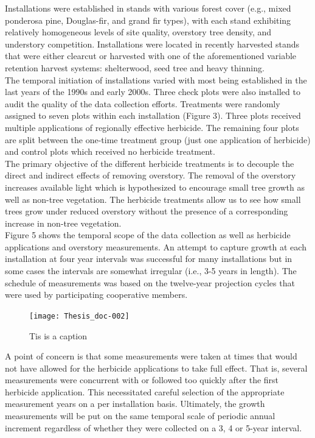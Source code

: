 \documentclass[10pt, letterpaper, fleqn]{article}
\begin{document}
Installations were established in stands with various forest cover (e.g., mixed ponderosa pine, Douglas-fir, and grand fir types), with each stand exhibiting relatively homogeneous levels of site quality, overstory tree density, and understory competition.  Installations were located in recently harvested stands that were either clearcut or harvested with one of the aforementioned variable retention harvest systems: shelterwood, seed tree and heavy thinning. \\[2pt]

The temporal initiation of installations varied with most being established in the last years of the 1990s and early 2000s.  Three check plots were also installed to audit the quality of the data collection efforts. Treatments were randomly assigned to seven plots within each installation (Figure 3).  Three plots received multiple applications of regionally effective herbicide.  The remaining four plots are split between the one-time treatment group (just one application of herbicide) and control plots which received no herbicide treatment.\\[2pt]

The primary objective of the different herbicide treatments is to decouple the direct and indirect effects of removing overstory. The removal of the overstory increases available light which is hypothesized to encourage small tree growth as well as non-tree vegetation.  The herbicide treatments allow us to see how small trees grow under reduced overstory without the presence of a corresponding increase in non-tree vegetation.\\[2pt]

Figure 5 shows the temporal scope of the data collection as well as herbicide applications and overstory measurements. An attempt to capture growth at each installation at four year intervals was successful for many installations but in some cases the intervals are somewhat irregular (i.e., 3-5 years in length). The schedule of measurements was based on the twelve-year projection cycles that were used by participating cooperative members.\\[2pt]
\begin{figure}
\begin{center}
\texttt{[image: Thesis\_doc-002]}
\caption{Tis is a caption}
\end{center}
\end{figure}
\noindent 
A point of concern is that some measurements were taken at times that would not have allowed for the herbicide applications to take full effect. That is, several measurements were concurrent with or followed too quickly after the first herbicide application.  This necessitated careful selection of the appropriate measurement years on a per installation basis.  Ultimately, the growth measurements will be put on the same temporal scale of periodic annual increment regardless of whether they were collected on a 3, 4 or 5-year interval. \\[2pt]
\end{document}
